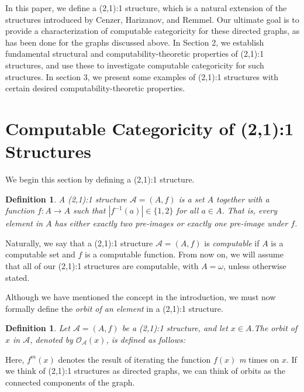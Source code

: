 \documentclass[12pt]{article}
\newtheorem{dfn}[thm]{Definition}
\begin{document}
In this paper, we define a (2,1):1 structure, which is a natural extension of the structures introduced by Cenzer, Harizanov, and Remmel. Our ultimate goal is to provide a characterization of computable categoricity for these directed graphs, as has been done for the graphs discussed above. In Section 2, we establish fundamental structural and computability-theoretic properties of (2,1):1 structures, and use these to investigate computable categoricity for such structures. In section 3, we present some examples of (2,1):1 structures with certain desired computability-theoretic properties. 

\section{Computable Categoricity of (2,1):1 Structures}

We begin this section by defining a (2,1):1 structure.

\begin{dfn}
A \emph{(2,1):1 structure} $\mathcal{A}=(A,f)$ is a set $A$ together with a function $f:A \to A$ such that $|f^{-1}(a)|\in \{1,2\}$ for all $a \in A$. That is, every element in $A$ has either exactly two pre-images or exactly one pre-image under $f$.
\end{dfn}

\noindent Naturally, we say that a (2,1):1 structure $\mathcal{A} = (A, f)$ is \emph{computable} if $A$ is a computable set and $f$ is a computable function. From now on, we will assume that all of our (2,1):1 structures are computable, with $A=\omega$, unless otherwise stated.

Although we have mentioned the concept in the introduction, we must now formally define the \emph{orbit of an element} in a (2,1):1 structure.

\begin{dfn}
Let $\mathcal{A} = (A, f)$ be a (2,1):1 structure, and let $x \in A$.The \emph{orbit of $x$ in $\mathcal{A}$}, denoted by $\mathcal{O}_{\mathcal{A}} (x)$, is defined as follows:\\

\end{dfn}

\noindent Here, $f^m(x)$ denotes the result of iterating the function $f(x)$ \emph{m} times on $x$. If we think of (2,1):1 structures as directed graphs, we can think of orbits as the connected components of the graph.
\end{document}
